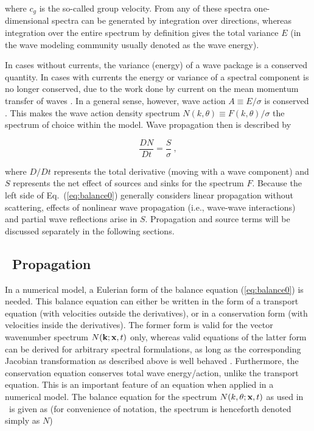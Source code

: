 \noindent
where $c_g$ is the so-called group velocity.  From any of these spectra
one-dimensional spectra can be generated by integration over directions,
whereas integration over the entire spectrum by definition gives the total
variance $E$ (in the wave modeling community usually denoted as the wave
energy).

In cases without currents, the variance (energy) of a wave package is a
conserved quantity. In cases with currents the energy or variance of a
spectral component is no longer conserved, due to the work done by current on
the mean momentum transfer of waves \citep{art:LHS61,art:LHS62}. In a general
sense, however, wave action $A \equiv E/\sigma$ is conserved
\citep[e.g.,][]{art:Whi65,art:BG68}. This makes the wave action density
spectrum $N(k,\theta) \equiv F(k,\theta)/\sigma$ the spectrum of choice within
the model. Wave propagation then is described by


\begin{equation}
\frac{D N}{D t} = \frac{S}{\sigma} \: ,
\label{eq:balance0}
\end{equation}

\noindent
where $D/Dt$ represents the total derivative (moving with a wave component)
and $S$ represents the net effect of sources and sinks for the spectrum
$F$. Because the left side of Eq.~(\ref{eq:balance0}) generally considers
linear propagation without scattering, effects of nonlinear wave propagation (i.e., wave-wave
interactions) and partial wave reflections arise in $S$. Propagation and source terms will be discussed
separately in the following sections.

\vssub
\subsection{~Propagation}
\vssub

In a numerical model, a Eulerian form of the balance equation
(\ref{eq:balance0}) is needed. This balance equation can either be written in
the form of a transport equation (with velocities outside the derivatives), or
in a conservation form (with velocities inside the derivatives). The former
form is valid for the vector wavenumber spectrum $N(\mbox{\bf k};\mbox{\bf x},t)$ only, whereas
valid equations of the latter form can be derived for arbitrary spectral
formulations, as long as the corresponding Jacobian transformation as
described above is well behaved \citep[e.g.,][]{tol:GAOS98b}. Furthermore, the
conservation equation conserves total wave energy/action, unlike the transport
equation. This is an important feature of an equation when applied in a
numerical model. The balance equation for the spectrum $N(k,\theta;\mbox{\bf x},t)$ as
used in \ws\ is given as (for convenience of notation, the spectrum is
henceforth denoted simply as $N$)

